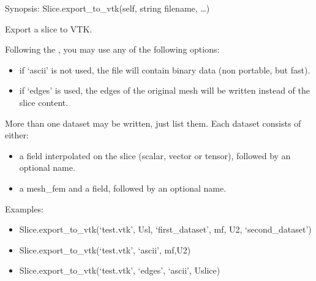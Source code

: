 \documentclass[a4paper,11pt,english]{sphinxmanual}
\begin{document}
\begin{fulllineitems}
\begin{fulllineitems}
\end{fulllineitems}


\begin{fulllineitems}
\label{\detokenize{python/cmdref_Slice:getfem.Slice.export_to_vtk}}
Synopsis: Slice.export\_to\_vtk(self, string filename, …)

Export a slice to VTK.

Following the , you may use any of the following options:
\begin{itemize}
\item {} 
if ‘ascii’ is not used, the file will contain binary data
(non portable, but fast).

\item {} 
if ‘edges’ is used, the edges of the original mesh will be
written instead of the slice content.

\end{itemize}

More than one dataset may be written, just list them. Each dataset
consists of either:
\begin{itemize}
\item {} 
a field interpolated on the slice (scalar, vector or tensor),
followed by an optional name.

\item {} 
a mesh\_fem and a field, followed by an optional name.

\end{itemize}

Examples:
\begin{itemize}
\item {} 
Slice.export\_to\_vtk(‘test.vtk’, Usl, ‘first\_dataset’, mf,
U2, ‘second\_dataset’)

\item {} 
Slice.export\_to\_vtk(‘test.vtk’, ‘ascii’, mf,U2)

\item {} 
Slice.export\_to\_vtk(‘test.vtk’, ‘edges’, ‘ascii’, Uslice)

\end{itemize}

\end{fulllineitems}



\end{fulllineitems}
\end{document}
